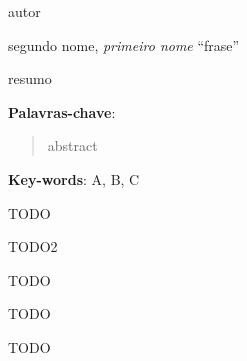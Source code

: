 \documentclass[tcc]{ic}
\begin{document}

\capa

\begin{agradecimentos}




\vspace{2em}
\begin{flushright}
autor
\end{flushright}


\vspace{30em}
\begin{epigraph}{segundo nome, \textit{primeiro nome}}
``frase''
\end{epigraph}



\end{agradecimentos}

\begin{resumo}

resumo

\vspace{1em}
\textbf{Palavras-chave}: 
\end{resumo}

\begin{abstract}
abstract

\end{abstract}
\vspace{1em}
\textbf{Key-words}:  A, B, C


\makefigurespage

\maketablespage
\listoftables

\listofalgorithms

\makeabrevpage{}

\makesymbolspage{}

\tableofcontents

\inicio




TODO

TODO2

TODO

TODO

TODO

% 
\begin{raggedright}

\renewcommand{\bibsection}{
\chapter*{\begin{flushright}Referências bibliográficas\end{flushright}}
\addcontentsline{toc}{chapter}{Referências bibliográficas}
}

\newpage\lhead{\rightmark}
\end{raggedright}
\end{document}
